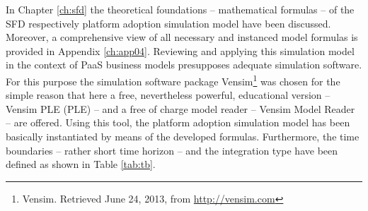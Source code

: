 In Chapter \ref{ch:sfd} the theoretical foundations -- mathematical formulas -- of the \ac{SFD} respectively platform adoption simulation model have been discussed. Moreover, a comprehensive view of all necessary and instanced model formulas is provided in Appendix \ref{ch:app04}. Reviewing and applying this simulation model in the context of \ac{PaaS} business models presupposes adequate simulation software. For this purpose the simulation software package Vensim\footnote{Vensim. Retrieved June 24, 2013, from \url{http://vensim.com}} was chosen for the simple reason that here a free, nevertheless powerful, educational version -- Vensim \acs{PLE} (\acl{PLE}) -- and a free of charge model reader -- Vensim Model Reader -- are offered. Using this tool, the platform adoption simulation model has been basically instantiated by means of the developed formulas. Furthermore, the time boundaries -- rather short time horizon -- and the integration type have been defined as shown in Table \ref{tab:tb}.

